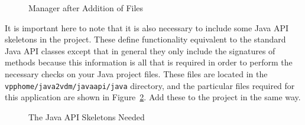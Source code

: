 \documentclass[\pformat,12pt]{article}
\newcommand{\vdmhome}{vpphome}
\begin{document}
\begin{figure}[tbh]
\begin{center}
\caption{Manager after Addition of Files}\label{fig:addedJavaFiles}
\end{center}
\end{figure}

It is important here to note that it is also necessary to include some
Java API skeletons in the project. These define functionality
equivalent to the standard Java API classes except that in general
they only include the signatures of methods because this information
is all that is required in order to perform the necessary checks on
your Java project files. These files are located in the {\tt
  \vdmhome/java2vdm/javaapi/java} directory, and the particular files
required for this application are shown in
Figure~\ref{fig:javaLibFiles}. Add these to the 
project in the same way.

\begin{figure}[tbh]
\begin{center}
\caption{The Java API Skeletons Needed}\label{fig:javaLibFiles}
\end{center}
\end{figure}
\end{document}
